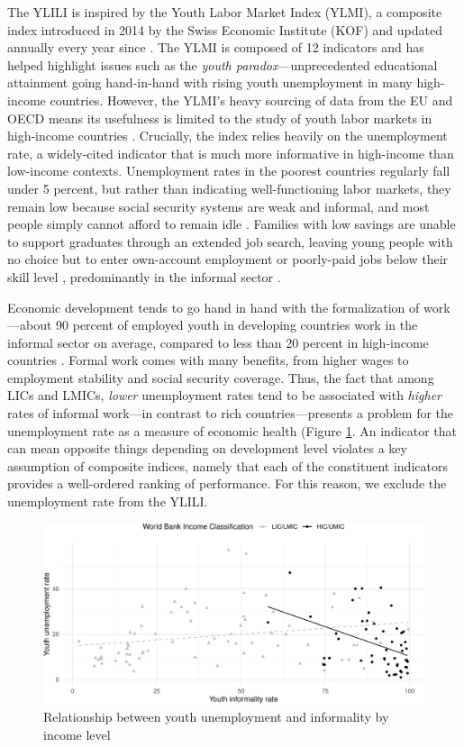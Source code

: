 \documentclass[
  a4paper, twoside, 12pt]{book}
\begin{document}
The YLILI is inspired by the Youth Labor Market Index (YLMI), a composite index introduced in 2014 by the Swiss Economic Institute (KOF) and updated annually every year since \autocite{renold2014}. The YLMI is composed of 12 indicators and has helped highlight issues such as the \emph{youth paradox}---unprecedented educational attainment going hand-in-hand with rising youth unemployment in many high-income countries. However, the YLMI's heavy sourcing of data from the EU and OECD means its usefulness is limited to the study of youth labor markets in high-income countries \autocite{pusterla2015,pusterla2016}. Crucially, the index relies heavily on the unemployment rate, a widely-cited indicator that is much more informative in high-income than low-income contexts. Unemployment rates in the poorest countries regularly fall under 5 percent, but rather than indicating well-functioning labor markets, they remain low because social security systems are weak and informal, and most people simply cannot afford to remain idle \autocite{filmer2014}. Families with low savings are unable to support graduates through an extended job search, leaving young people with no choice but to enter own-account employment or poorly-paid jobs below their skill level \autocite[margolis2014]{fields2012}, predominantly in the informal sector \autocite{herrera2013,sengenberger2011}.

Economic development tends to go hand in hand with the formalization of work \autocite{laporta2014}---about 90 percent of employed youth in developing countries work in the informal sector on average, compared to less than 20 percent in high-income countries \autocite{bonnet2018}. Formal work comes with many benefits, from higher wages to employment stability and social security coverage. Thus, the fact that among LICs and LMICs, \emph{lower} unemployment rates tend to be associated with \emph{higher} rates of informal work---in contrast to rich countries---presents a problem for the unemployment rate as a measure of economic health (Figure \ref{fig:fig-infunemp}. An indicator that can mean opposite things depending on development level violates a key assumption of composite indices, namely that each of the constituent indicators provides a well-ordered ranking of performance. For this reason, we exclude the unemployment rate from the YLILI.

\begin{figure}[H]
\includegraphics{figures/fig-infunemp-1} \caption{Relationship between youth unemployment and informality by income level}\label{fig:fig-infunemp}
\end{figure}
\end{document}
